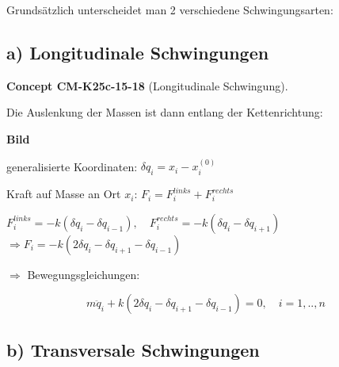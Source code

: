 \documentclass[10pt, letterpaper]{article}
\newcommand{\CustomHeading}[3]{%
  \par\medskip\noindent%
  \textbf{#1 #2} \textnormal{(#3)}.\enskip%
}
\newenvironment{CONC}[2]{\begin{unitbox}\CustomHeading{Concept}{#1}{#2}}{\end{unitbox}}
\begin{document}
Grundsätzlich unterscheidet man 2 verschiedene Schwingungsarten:

\subsection*{a) Longitudinale Schwingungen}

\begin{CONC}{CM-K25c-15-18}{Longitudinale Schwingung}
Die Auslenkung der Massen ist dann entlang der Kettenrichtung:

\textbf{Bild}

generalisierte Koordinaten: $\delta q_i = x_i - x_i^{(0)}$

Kraft auf Masse an Ort $x_i$: $F_i = F_i^{links} + F_i^{rechts}$

$F_i^{links} = -k(\delta q_i - \delta q_{i-1}), \quad F_i^{rechts} = -k(\delta q_i - \delta q_{i+1})$
$\Rightarrow F_i = -k(2\delta q_i - \delta q_{i+1} - \delta q_{i-1})$

$\Rightarrow$ Bewegungsgleichungen:

\begin{equation}
m\ddot{q}_i + k(2\delta q_i - \delta q_{i+1} - \delta q_{i-1}) = 0, \quad i=1,..,n
\end{equation}
\end{CONC}

\subsection*{b) Transversale Schwingungen}
\end{document}
